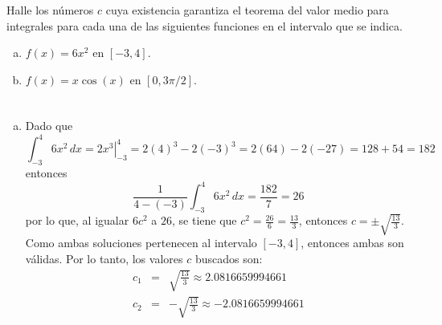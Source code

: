 \begin{enunciado}
 Halle los n\'umeros $c$ cuya existencia garantiza el teorema del valor medio para integrales para cada una de las siguientes funciones en el intervalo que se indica.
 \begin{enumerate}[(a)]
  \item $f(x) = 6x^2$ en $[-3,4]$.
  
  \item $f(x) = x\cos(x)$ en $[0,3\pi/2]$.
 \end{enumerate}
\end{enunciado}

\begin{solucion}
 $\phantom{0}$
 \begin{enumerate}[(a)]
  \item Dado que
  \begin{equation*}
   \int_{-3}^{4} 6x^2 \, dx = \left. 2x^3 \right|_{-3}^{4} = 2(4)^3 - 2(-3)^3 = 2(64) - 2(-27) = 128 + 54 = 182
  \end{equation*}
  entonces 
  \begin{equation*}
   \frac{1}{4-(-3)} \int_{-3}^{4} 6x^2 \, dx = \frac{182}{7} = 26
  \end{equation*}
  por lo que, al igualar $6c^2$ a $26$, se tiene que $c^2 = \frac{26}{6} = \frac{13}{3}$, entonces $c = \pm \sqrt{\frac{13}{3}}$. Como ambas soluciones pertenecen al intervalo $[-3,4]$, entonces ambas son v\'alidas. Por lo tanto, los valores $c$ buscados son:
  \begin{eqnarray*}
   c_1 & = & \sqrt{\frac{13}{3}} \approx 2.0816659994661 \\
   c_2 & = & - \sqrt{\frac{13}{3}} \approx - 2.0816659994661
  \end{eqnarray*}


\end{enumerate}
\end{solucion}
